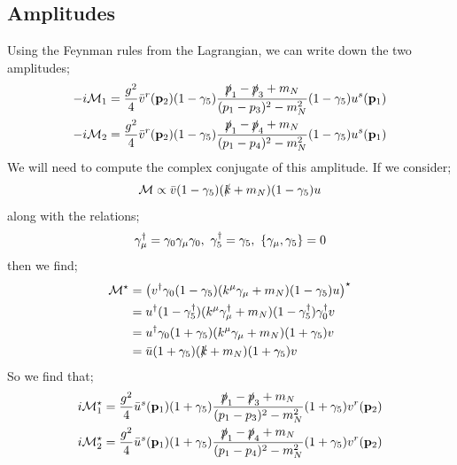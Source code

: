 \documentclass[10pt]{article}
\begin{document}
\subsection{Amplitudes}
\noindent Using the Feynman rules from the Lagrangian, we can write down the two amplitudes;
\begin{align}
-i\mathcal{M}_1 &= \frac{g^2}{4}\bar{v}^r(\mathbf{p}_2)(1 - \gamma_5)\frac{\slashed{p}_1 - \slashed{p}_3 + m_N}{(p_1 - p_3)^2 - m_N^2}(1 - \gamma_5)u^s(\mathbf{p}_1) \\
-i\mathcal{M}_2 &= \frac{g^2}{4}\bar{v}^r(\mathbf{p}_2)(1 - \gamma_5)\frac{\slashed{p}_1 - \slashed{p}_4 + m_N}{(p_1 - p_4)^2 - m_N^2}(1 - \gamma_5)u^s(\mathbf{p}_1)
\end{align}
We will need to compute the complex conjugate of this amplitude. If we consider;
\begin{equation*}
\mathcal{M} \propto \bar{v}(1 - \gamma_5)(\slashed{k} + m_N)(1 - \gamma_5)u
\end{equation*}
along with the relations;
\begin{equation}
\gamma_\mu^{\dagger} = \gamma_0 \gamma_\mu \gamma_0, \,\, \gamma_5^{\dagger} = \gamma_5, \,\, \left\{\gamma_\mu, \gamma_5\right\} = 0
\end{equation}
then we find;
\begin{align*}
\mathcal{M}^{\star} &= \left(v^{\dagger}\gamma_0(1 - \gamma_5)(k^{\mu}\gamma_\mu + m_N)(1 - \gamma_5)u\right)^{\star} \\
&= u^{\dagger}(1 - \gamma_5^{\dagger})(k^{\mu}\gamma_\mu^{\dagger} + m_N)(1 - \gamma_5^{\dagger})\gamma_0^{\dagger}v \\
&= u^{\dagger}\gamma_0(1 + \gamma_5)(k^{\mu}\gamma_\mu + m_N)(1 + \gamma_5)v \\
&= \bar{u}(1 + \gamma_5)(\slashed{k} + m_N)(1 + \gamma_5)v
\end{align*}
So we find that;
\begin{align}
i\mathcal{M}_1^{\star} &= \frac{g^2}{4}\bar{u}^{s}(\mathbf{p}_1)(1 + \gamma_5)\frac{\slashed{p}_1 - \slashed{p}_3 + m_N}{(p_1 - p_3)^2 - m_N^2}(1 + \gamma_5)v^{r}(\mathbf{p}_2) \\
i\mathcal{M}_2^{\star} &= \frac{g^2}{4}\bar{u}^{s}(\mathbf{p}_1)(1 + \gamma_5)\frac{\slashed{p}_1 - \slashed{p}_4 + m_N}{(p_1 - p_4)^2 - m_N^2}(1 + \gamma_5)v^{r}(\mathbf{p}_2)
\end{align}
\end{document}
